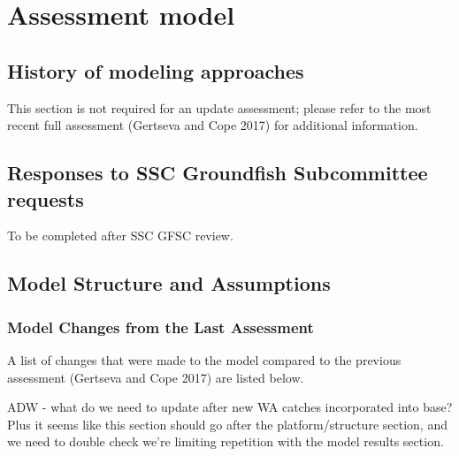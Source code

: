 \documentclass[
]{scrartcl}
\begin{document}
\newpage{}

\section{Assessment model}\label{assessment-model}

\subsection{History of modeling
approaches}\label{history-of-modeling-approaches}

This section is not required for an update assessment; please refer to
the most recent full assessment (Gertseva and Cope 2017) for additional
information.

\subsection{Responses to SSC Groundfish Subcommittee
requests}\label{responses-to-ssc-groundfish-subcommittee-requests}

To be completed after SSC GFSC review.

\subsection{Model Structure and
Assumptions}\label{model-structure-and-assumptions}

\subsubsection{Model Changes from the Last
Assessment}\label{sec-changes}

A list of changes that were made to the model compared to the previous
assessment (Gertseva and Cope 2017) are listed below.

ADW - what do we need to update after new WA catches incorporated into
base? Plus it seems like this section should go after the
platform/structure section, and we need to double check we're limiting
repetition with the model results section.
\end{document}
